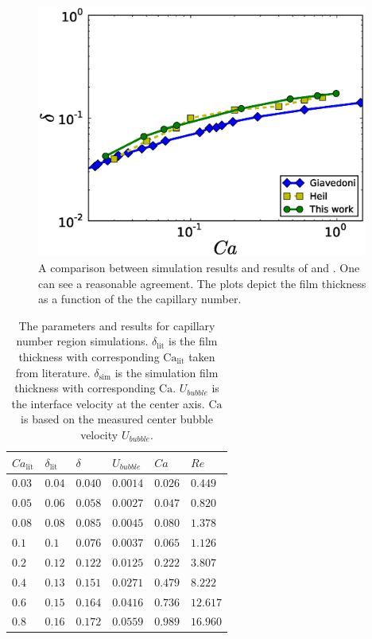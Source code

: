 \documentclass[preprint,12pt]{elsarticle}
\newcommand{\Ca}{\mathrm{Ca}}
\begin{document}
\begin{figure}
\includegraphics[width=0.97\textwidth]{Figures/Capillary/capillaries_comparison_real.eps}
\caption{A comparison between simulation results and results of
\citet{giavedoni-numerical} and \citet{heil-bretherton}. One can see a
reasonable agreement. The plots depict the film thickness as a function of the
the capillary number.\label{fig:capillary:comparison}}
\end{figure}

\begin{table}
\begin{tabularx}{\textwidth}{|X|X|X|X|X|X|}
\hline
$Ca_{\mathrm{lit}}$&$\delta_{\mathrm{lit}}$&$\delta$&$U_{bubble}$&$Ca$&{\color{red}$Re$}\\
\hline
$0.03$&$0.04$&$0.040$&$0.0014$&$0.026$&$0.449$\\
\hline
$0.05$&$0.06$&$0.058$&$0.0027$&$0.047$&$0.820$\\
\hline
$0.08$&$0.08$&$0.085$&$0.0045$&$0.080$&$1.378$\\
\hline
$0.1$&$0.1$&$0.076$&$0.0037$&$0.065$&$1.126$\\
\hline
$0.2$&$0.12$&$0.122$&$0.0125$&$0.222$&$3.807$\\
\hline
$0.4$&$0.13$&$0.151$&$0.0271$&$0.479$&$8.222$\\
\hline
$0.6$&$0.15$&$0.164$&$0.0416$&$0.736$&$12.617$\\
\hline
$0.8$&$0.16$&$0.172$&$0.0559$&$0.989$&$16.960$\\
\hline
\end{tabularx}
\caption{The parameters and results for capillary number region simulations.
$\delta_{\mathrm{lit}}$ is the film thickness with corresponding $\Ca_{\mathrm{lit}}$ taken from
literature. $\delta_\mathrm{sim}$ is the simulation film thickness with corresponding $\Ca$.
{\color{red}$U_{bubble}$ is the interface velocity at the center axis.} $\Ca$ is based on
the measured center bubble velocity
$U_{bubble}$.
\label{table:parameters:capillary:number}}
\end{table}
\end{document}
